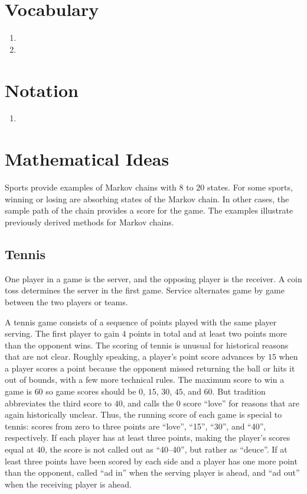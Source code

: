 \documentclass[12pt]{article}
\begin{document}
\hr

\section*{Vocabulary}
\begin{enumerate}
    \item
    \item
\end{enumerate}

\hr

\section*{Notation}
\begin{enumerate}
    \item
\end{enumerate}

\section*{Mathematical Ideas}

Sports provide examples of Markov chains with \( 8 \) to \( 20 \)
states.  For some sports, winning or losing are absorbing states of the
Markov chain.  In other cases, the sample path of the chain provides a
score for the game.  The examples illustrate previously derived methods
for Markov chains.

\subsection*{Tennis}

One player in a game is the server, and the opposing player is the
receiver.  A coin toss determines the server in the first game. Service
alternates game by game between the two players or teams.

A tennis game consists of a sequence of points played with the same
player serving.  The first player to gain \( 4 \) points in total and at
least two points more than the opponent wins.  The scoring of tennis is
unusual for historical reasons that are not clear.  Roughly speaking, a
player's point score advances by \( 15 \) when a player scores a point
because the opponent missed returning the ball or hits it out of bounds,
with a few more technical rules.  The maximum score to win a game is \(
60 \) so game scores should be \( 0 \), \( 15 \), \( 30 \), \( 45 \),
and \( 60 \).  But tradition abbreviates the third score to \( 40 \),
and calls the \( 0 \) score ``love'' for reasons that are again
historically unclear.  Thus, the running score of each game is special
to tennis:  scores from zero to three points are ``love'', ``15'',
``30'', and ``40'', respectively.  If each player has at least three
points, making the player's scores equal at 40, the score is not called
out as ``40--40'', but rather as ``deuce''.  If at least three points
have been scored by each side and a player has one more point than the
opponent, called ``ad in'' when the serving player is ahead, and ``ad
out'' when the receiving player is ahead.
\end{document}
